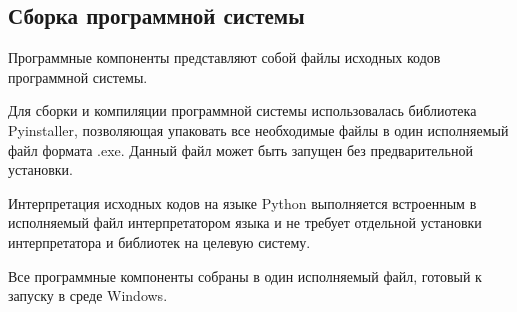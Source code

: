 \subsection{Сборка программной системы}

Программные компоненты представляют собой файлы исходных кодов программной системы.

Для сборки и компиляции программной системы использовалась библиотека Pyinstaller, позволяющая упаковать все необходимые файлы в один исполняемый файл формата .exe. Данный файл может быть запущен без предварительной установки.

Интерпретация исходных кодов на языке Python выполняется встроенным в исполняемый файл интерпретатором языка и не требует отдельной установки интерпретатора и библиотек на целевую систему.

Все программные компоненты собраны в один исполняемый файл, готовый к запуску в среде Windows.